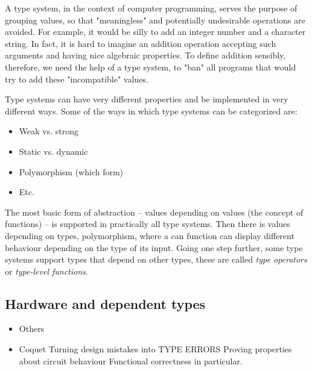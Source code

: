 \documentclass[a4paper,draft]{report}
\begin{document}
                A type system, in the context of computer programming,
                serves the purpose of grouping values, so that "meaningless" and potentially undesirable operations are avoided.
                For example, it would be silly to add an integer number and a character string.
                In fact, it is hard to imagine an addition operation accepting such arguments and having nice algebraic properties.
                To define addition sensibly, therefore, we need the help of a type system, to "ban" all programs that would
                try to add these "incompatible" values.

                Type systems can have very different properties and be implemented in very different ways.
                Some of the ways in which type systems can be categorized are:
                \begin{itemize}
                    \item Weak vs. strong
                    \item Static vs. dynamic
                    \item Polymorphism (which form)
                    \item Etc.
                \end{itemize}

                The most basic form of abstraction -- values depending on values (the concept of functions) -- is
                supported in practically all type systems.
                Then there is values depending on types, polymorphism, where a can function can display different
                behaviour depending on the type of its input.
                Going one step further, some type systems support types that depend on other types, these are
                called \emph{type operators} or \emph{type-level functions}.

            \subsection{Hardware and dependent types}
            \label{sec:hardware-dtp}
                \begin{itemize}
                    \item Others
                    \item Coquet
                        \subitem Turning design mistakes into TYPE ERRORS
                        \subitem Proving properties about circuit behaviour
                        \subsubitem Functional correctness in particular.
                \end{itemize}
\end{document}
